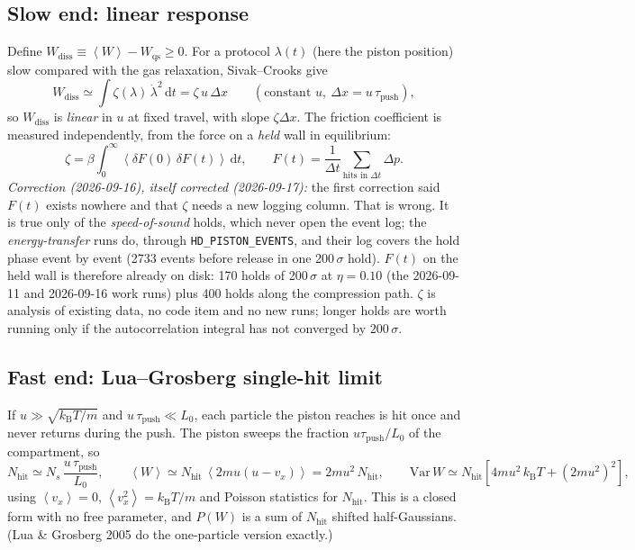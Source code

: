 \documentclass[11pt,a4paper]{article}
\newcommand{\kT}{k_{\mathrm B}T}
\newcommand{\avg}[1]{\left\langle #1 \right\rangle}
\newcommand{\dd}{\mathrm{d}}
\begin{document}
\subsection{Slow end: linear response}
Define $W_{\mathrm{diss}} \equiv \avg{W} - W_{\mathrm{qs}} \ge 0$. For a protocol $\lambda(t)$ (here the piston position) slow compared with the gas relaxation, Sivak--Crooks give
\begin{equation}
W_{\mathrm{diss}} \simeq \int \zeta(\lambda)\,\dot\lambda^2\,\dd t
= \zeta\,u\,\Delta x
\qquad(\text{constant }u,\ \Delta x = u\,\tau_{\mathrm{push}}),
\label{eq:sivak}
\end{equation}
so $W_{\mathrm{diss}}$ is \emph{linear} in $u$ at fixed travel, with slope $\zeta\Delta x$. The friction coefficient is measured independently, from the force on a \emph{held} wall in equilibrium:
\begin{equation}
\zeta = \beta\int_0^\infty \avg{\delta F(0)\,\delta F(t)}\,\dd t,
\qquad F(t) = \frac{1}{\Delta t}\sum_{\text{hits in }\Delta t}\Delta p .
\label{eq:zeta}
\end{equation}
\emph{Correction (2026-09-16), itself corrected (2026-09-17):} the first correction said $F(t)$ exists nowhere and that $\zeta$ needs a new logging column. That is wrong. It is true only of the \emph{speed-of-sound} holds, which never open the event log; the \emph{energy-transfer} runs do, through \texttt{HD\_PISTON\_EVENTS}, and their log covers the hold phase event by event (2733 events before release in one 200\,$\sigma$ hold). $F(t)$ on the held wall is therefore already on disk: 170 holds of 200\,$\sigma$ at $\eta = 0.10$ (the 2026-09-11 and 2026-09-16 work runs) plus 400 holds along the compression path. $\zeta$ is analysis of existing data, no code item and no new runs; longer holds are worth running only if the autocorrelation integral has not converged by $200\,\sigma$.

\subsection{Fast end: Lua--Grosberg single-hit limit}\label{sec:fast}
If $u \gg \sqrt{\kT/m}$ and $u\,\tau_{\mathrm{push}} \ll L_0$, each particle the piston reaches is hit once and never returns during the push. The piston sweeps the fraction $u\tau_{\mathrm{push}}/L_0$ of the compartment, so
\begin{equation}
N_{\mathrm{hit}} \simeq N_s\,\frac{u\,\tau_{\mathrm{push}}}{L_0},\qquad
\avg{W} \simeq N_{\mathrm{hit}}\,\avg{2mu(u - v_x)} = 2mu^2\,N_{\mathrm{hit}},\qquad
\mathrm{Var}\,W \simeq N_{\mathrm{hit}}\left[4mu^2\,\kT + (2mu^2)^2\right],
\label{eq:LG}
\end{equation}
using $\avg{v_x} = 0$, $\avg{v_x^2} = \kT/m$ and Poisson statistics for $N_{\mathrm{hit}}$. This is a closed form with no free parameter, and $P(W)$ is a sum of $N_{\mathrm{hit}}$ shifted half-Gaussians. (Lua \& Grosberg 2005 do the one-particle version exactly.)
\end{document}
